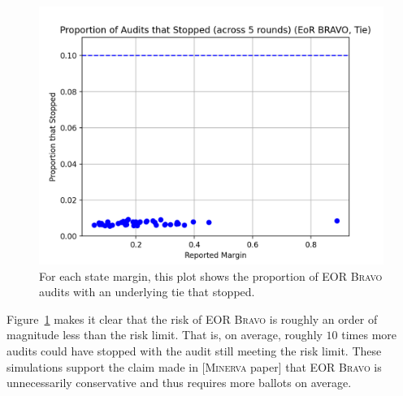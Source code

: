 \documentclass[runningheads]{llncs}
\newcommand{\Minerva}{\textsc{Minerva}\xspace}
\newcommand{\BRAVO}{\textsc{Bravo}\xspace}
\begin{document}
\begin{figure}[H]
\includegraphics[width=\textwidth]{eor_bravo_90perc_10^4_corrected/total_risk.png}
\caption{For each state margin, this plot shows
the proportion of EOR \BRAVO audits with an underlying
tie that stopped.}
\label{fig:eor_bravo_risk}
\end{figure}

Figure~\ref{fig:eor_bravo_risk} makes it clear that the risk of EOR \BRAVO is roughly
an order of magnitude less than the risk limit. 
That is, on average, roughly $10$ times more audits could have stopped 
with the audit still meeting the risk limit.
These simulations support the claim made in [\Minerva paper]
that EOR \BRAVO is unnecessarily conservative and thus requires
more ballots on average.

\end{document}
